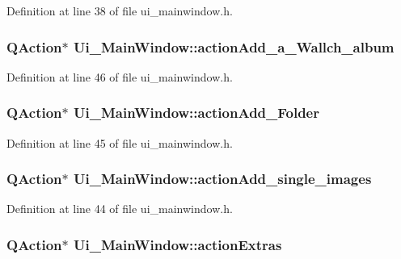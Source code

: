 Definition at line 38 of file ui\_\-mainwindow.h.

\hypertarget{classUi__MainWindow_adbdbc9d312e983ed7ffa1a99793eeec7}{
\subsubsection[{actionAdd\_\-a\_\-Wallch\_\-album}]{\setlength{\rightskip}{0pt plus 5cm}QAction$\ast$ {\bf Ui\_\-MainWindow::actionAdd\_\-a\_\-Wallch\_\-album}}}
\label{classUi__MainWindow_adbdbc9d312e983ed7ffa1a99793eeec7}


Definition at line 46 of file ui\_\-mainwindow.h.

\hypertarget{classUi__MainWindow_a3cae951a389067a889312a8db264268e}{
\subsubsection[{actionAdd\_\-Folder}]{\setlength{\rightskip}{0pt plus 5cm}QAction$\ast$ {\bf Ui\_\-MainWindow::actionAdd\_\-Folder}}}
\label{classUi__MainWindow_a3cae951a389067a889312a8db264268e}


Definition at line 45 of file ui\_\-mainwindow.h.

\hypertarget{classUi__MainWindow_a48c15a8b0d5bd0ba1289d785e76a744b}{
\subsubsection[{actionAdd\_\-single\_\-images}]{\setlength{\rightskip}{0pt plus 5cm}QAction$\ast$ {\bf Ui\_\-MainWindow::actionAdd\_\-single\_\-images}}}
\label{classUi__MainWindow_a48c15a8b0d5bd0ba1289d785e76a744b}


Definition at line 44 of file ui\_\-mainwindow.h.

\hypertarget{classUi__MainWindow_ace7456abb046b1c717cb786b1643e60e}{
\subsubsection[{actionExtras}]{\setlength{\rightskip}{0pt plus 5cm}QAction$\ast$ {\bf Ui\_\-MainWindow::actionExtras}}}
\label{classUi__MainWindow_ace7456abb046b1c717cb786b1643e60e}


